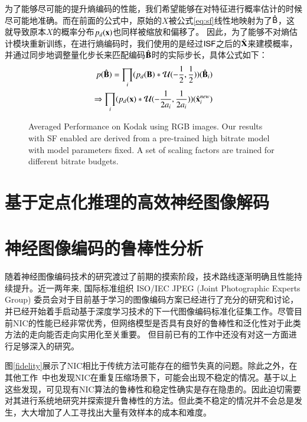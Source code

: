 \documentclass[macfonts,phd,oneside,nobackinfo]{njuthesis}
\begin{document}
为了能够尽可能的提升熵编码的性能，我们希望能够在对特征进行概率估计的时候尽可能地准确。而在前面的公式中，原始的$X$被公式\eqref{eq:sf}线性地映射为了$\hat{\sf B}$，这就导致原本$X$的概率分布${p_d}(\bf x)$也同样被缩放和偏移了。 因此，为了能够不对熵估计模块重新训练，在进行熵编码时，我们使用的是经过$\sf ISF$之后的$\hat{\bf X}$来建模概率， 并通过同步地调整量化步长来匹配编码$\hat{\bf B}$时的实际步长，具体公式如下：
\begin{align}
  p(\hat{\bf B}) = {\prod_i} ({p_d}({\bf B}) *\mathcal{U}(-\frac{1}{2},\frac{1}{2}))(\hat {\bf B}_i) \nonumber \\ \Rightarrow {\prod_i} ({p_d}({\bf x}) *\mathcal{U}(-\frac{1}{2a_i},\frac{1}{2a_i})) (\hat{\bf x}^{new}_i)
  \label{eq:estimator}
\end{align}

\begin{figure}[htb]
      \centering
      \caption{Averaged Performance on Kodak using RGB images. Our results with SF enabled are derived from a pre-trained high bitrate model with model parameters fixed.  A set of scaling factors are trained for different bitrate budgets.}
      \label{fig:performance}
\end{figure}

\section{基于定点化推理的高效神经图像解码}
\section{神经图像编码的鲁棒性分析}
随着神经图像编码技术的研究渡过了前期的摸索阶段，技术路线逐渐明确且性能持续提升。近一两年来, 国际标准组织 ISO/IEC JPEG (Joint Photographic Experts Group) 委员会对于目前基于学习的图像编码方案已经进行了充分的研究和讨论，并已经开始着手启动基于深度学习技术的下一代图像编码标准化征集工作。尽管目前NIC的性能已经非常优秀，但网络模型是否具有良好的鲁棒性和泛化性对于此类方法的走向能否走向实用化至关重要。 但目前已有的工作中还没有对这一方面进行足够深入的研究。

图\ref{fidelity}展示了NIC相比于传统方法可能存在的细节失真的问题。除此之外，在其他工作~\cite{kim2020}中也发现NIC在重复压缩场景下，可能会出现不稳定的情况。基于以上这些发现，可见现有NIC算法的鲁棒性和稳定性确实是存在隐患的。因此迫切需要对其进行系统地研究并探索提升鲁棒性的方法。但此类不稳定的情况并不会总是发生，大大增加了人工寻找出大量有效样本的成本和难度。
\end{document}
